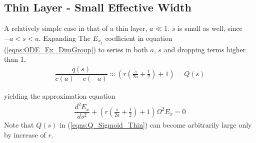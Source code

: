 \documentclass[twocolumn,secnumarabic,amssymb, nobibnotes, aps, prd]{revtex4-1}
\begin{document}
\subsection{Thin Layer - Small Effective Width }
A relatively simple case in that of a thin layer, $a \ll 1$.
$s$ is small as well, since $-a<s<a$. Expanding The $E_{x_j}$ coefficient in equation (\ref{eqns:ODE_Ex_DimGroup}) to series in both $a$, $s$ and dropping terms higher than 1, 
\begin{align}
\label{eqns:Q_Sigmoid_Thin}
\dfrac{q(s)}{c(a)-c(-a)} \approx \left( r \left(\frac{s}{2 a}+\frac{1}{2}\right)+1 \right)=Q(s) 
\end{align}

yielding the approximation equation
\begin{align}
\label{eqns:ode_Sigmoid_Thin}
\dfrac{d^2 E_x}{ds^2}+\left( r \left(\frac{s}{2 a}+\frac{1}{2}\right)+1 \right) \Omega^2 E_x = 0
\end{align}
Note that $Q(s)$ in (\ref{eqns:Q_Sigmoid_Thin}) can become arbitrarily large only by increase of $r$. 
\end{document}
